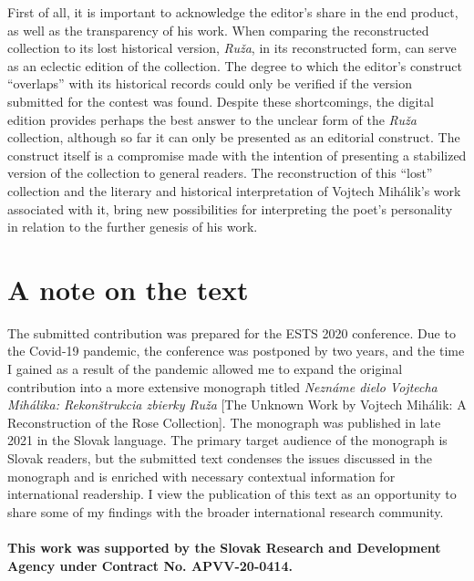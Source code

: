 \documentclass{article}
\begin{document}
First of all, it is important to acknowledge the editor's share in the
end product, as well as the transparency of his work. When comparing the
reconstructed collection to its lost historical version, \emph{Ruža}, in
its reconstructed form, can serve as an eclectic edition of the
collection. The degree to which the editor's construct ``overlaps'' with
its historical records could only be verified if the version submitted
for the contest was found. Despite these shortcomings, the digital
edition provides perhaps the best answer to the unclear form of the
\emph{Ruža} collection, although so far it can only be presented as an
editorial construct. The construct itself is a compromise made with the
intention of presenting a stabilized version of the collection to
general readers. The reconstruction of this ``lost'' collection and the
literary and historical interpretation of Vojtech Mihálik's work
associated with it, bring new possibilities for interpreting the poet's
personality in relation to the further genesis of his work.

\section*{A note on the text}

The submitted contribution was prepared for the ESTS 2020 conference.
Due to the Covid-19 pandemic, the conference was postponed by two years,
and the time I gained as a result of the pandemic allowed me to expand
the original contribution into a more extensive monograph titled
\emph{Neznáme dielo Vojtecha Mihálika: Rekonštrukcia zbierky Ruža} [The Unknown Work by Vojtech Mihálik: A Reconstruction of the Rose Collection]. The
monograph was published in late 2021 in the Slovak language. The primary
target audience of the monograph is Slovak readers, but the submitted
text condenses the issues discussed in the monograph and is enriched
with necessary contextual information for international readership. I
view the publication of this text as an opportunity to share some of my
findings with the broader international research community.
\\ \\
\textbf{This work was supported by the Slovak Research and Development
Agency under Contract No. APVV-20-0414.}
\\ \\


\begin{flushleft}
    \renewcommand*{\mkbibnamefamily}[1]{\textsc{#1}}
    \renewcommand*{\mkbibnamegiven}[1]{\textsc{#1}} 
\printbibliography
\end{flushleft}
\end{document}
